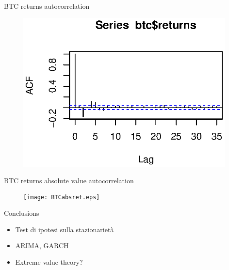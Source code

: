 \documentclass{beamer}
\begin{document}
\begin{frame}{BTC returns autocorrelation}
	\begin{figure}[linewidth=250mm]	
		\includegraphics[width=110mm]{BTCautocor.eps}
	\end{figure}
\end{frame}


\begin{frame}{BTC returns absolute value autocorrelation}
	\begin{figure}[b]	
		\texttt{[image: BTCabsret.eps]}
	\end{figure}
\end{frame}

%

\begin{frame}{Conclusions}
	\begin{itemize}
		\item Test di ipotesi sulla stazionarietà
		\item ARIMA, GARCH
		\item Extreme value theory?
	\end{itemize}
\end{frame}
\end{document}

